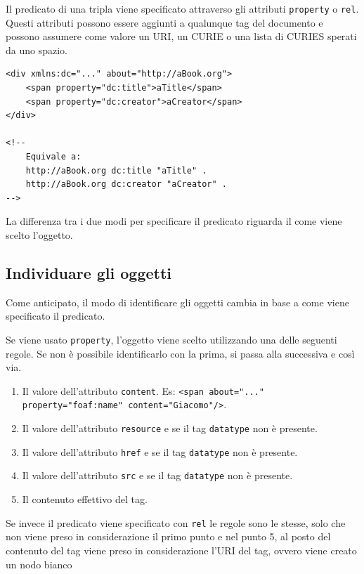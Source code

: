 Il predicato di una tripla viene specificato attraverso gli attributi \texttt{property} o \texttt{rel}.
Questi attributi possono essere aggiunti a qualunque tag del documento e possono assumere come valore un URI, un CURIE o una lista di CURIES sperati da uno spazio.

\begin{lstlisting}[caption=Utilizzo di property, language=RDFA]
<div xmlns:dc="..." about="http://aBook.org">
	<span property="dc:title">aTitle</span>
	<span property="dc:creator">aCreator</span>
</div>

<!--
	Equivale a:
	http://aBook.org dc:title "aTitle" .
	http://aBook.org dc:creator "aCreator" .
-->
\end{lstlisting}

La differenza tra i due modi per specificare il predicato riguarda il come viene scelto l'oggetto.

\subsection{Individuare gli oggetti}

Come anticipato, il modo di identificare gli oggetti cambia in base a come viene specificato il predicato.

Se viene usato \texttt{property}, l'oggetto viene scelto utilizzando una delle seguenti regole. Se non è possibile identificarlo con la prima, si passa alla successiva e così via.

\begin{enumerate}
	\item Il valore dell'attributo \texttt{content}. Es: \texttt{<span about="..." property="foaf:name" content="Giacomo"/>}.
	\item Il valore dell'attributo \texttt{resource} e se il tag \texttt{datatype} non è presente.
	\item Il valore dell'attributo \texttt{href} e se il tag \texttt{datatype} non è presente.
	\item Il valore dell'attributo \texttt{src} e se il tag \texttt{datatype} non è presente.
	\item Il contenuto effettivo del tag.
\end{enumerate}

Se invece il predicato viene specificato con \texttt{rel} le regole sono le stesse, solo che non viene preso in considerazione il primo punto e nel punto 5, al posto del contenuto del tag viene preso in considerazione l'URI del tag, ovvero viene creato un nodo bianco

